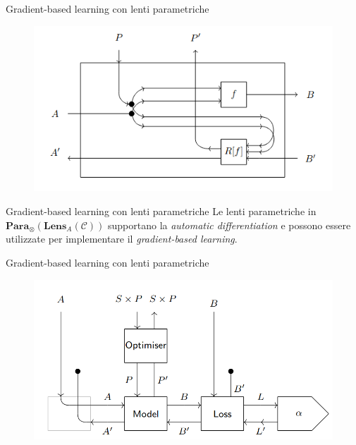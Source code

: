 \documentclass{beamer}
\begin{document}
\begin{frame}{Gradient-based learning con lenti parametriche}
    \begin{figure}
        \begin{center}
            \includegraphics[width=\textwidth]{figures/parametric_lens.png}
            \caption*{}
        \end{center}
    \end{figure}
\end{frame}

\begin{frame}{Gradient-based learning con lenti parametriche}
    Le lenti parametriche in $\mathbf{Para}_{\otimes}(\mathbf{Lens}_A(\mathcal{C}))$ supportano la \textit{automatic differentiation} e possono essere utilizzate per implementare il \textit{gradient-based learning}. 
\end{frame}


\begin{frame}{Gradient-based learning con lenti parametriche}
    \begin{figure}
        \begin{center}
            \includegraphics[width=\textwidth]{figures/lenses_supervised_learning2.png}
            \caption*{}
        \end{center}
    \end{figure}
\end{frame}
\end{document}
